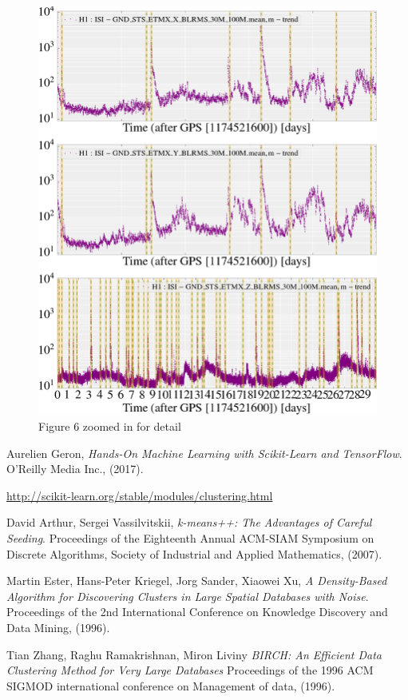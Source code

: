 \documentclass[colorlinks=true,pdfstartview=FitV,linkcolor=blue,
            citecolor=red,urlcolor=magenta]{ligodoc}
\begin{document}
\begin{figure}[htbp]
\begin{center}
\includegraphics[scale = 0.35]{ConvNet-Comparison2_crop.png}
\caption{Figure 6 zoomed in for detail}
\label{fig:image6}
\end{center}
\end{figure}

\begin{thebibliography}{9}
      
	  Aurelien Geron,
	  \emph{Hands-On Machine Learning with Scikit-Learn and TensorFlow}.
	  O'Reilly Media Inc., (2017).    
        
          \url{http://scikit-learn.org/stable/modules/clustering.html}

          David Arthur, Sergei Vassilvitskii,
          \emph{k-means++: The Advantages of Careful Seeding}.
          Proceedings of the Eighteenth Annual ACM-SIAM Symposium on Discrete Algorithms, Society of Industrial and Applied Mathematics, (2007).

          Martin Ester, Hans-Peter Kriegel, Jorg Sander, Xiaowei Xu,
          \emph{A Density-Based Algorithm for Discovering Clusters in Large Spatial Databases with Noise}.
          Proceedings of the 2nd International Conference on Knowledge Discovery and Data Mining, (1996).

          Tian Zhang, Raghu Ramakrishnan, Miron Liviny
          \emph{BIRCH: An Efficient Data Clustering Method for Very Large Databases}
          Proceedings of the 1996 ACM SIGMOD international conference on Management of data, (1996). 
          
\end{thebibliography}
\end{document}
